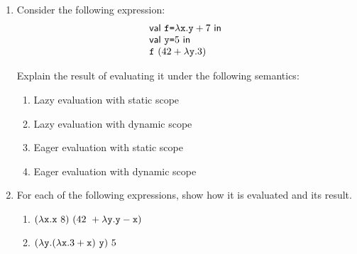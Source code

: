 \begin{enumerate}
\item Consider the following expression:
\[
\begin{array}{l}
  \textsf{val}\ \texttt{f}\texttt{=}\lambda\texttt{x}.\texttt{y}+7\ \textsf{in}\ \\
  \textsf{val}\ \texttt{y}\texttt{=}5\ \textsf{in}\ \\
  \texttt{f}\ (42+\lambda\texttt{y}.3)
 
 
\end{array}
\]

Explain the result of evaluating it under the following semantics:
\begin{enumerate}
  \item Lazy evaluation with static scope
  \item Lazy evaluation with dynamic scope
  \item Eager evaluation with static scope
  \item Eager evaluation with dynamic scope
\end{enumerate}

\item For each of the following \lang expressions, show how it is evaluated and its result.

\begin{enumerate}
  \item
    $(\lambda\texttt{x}.\texttt{x}\ 8)\ (42\ +\lambda\texttt{y}.\texttt{y}-\texttt{x})$
  \item
    $(\lambda\texttt{y}.(\lambda\texttt{x}.3+\texttt{x})\ \texttt{y})\ 5$
\end{enumerate}
\end{enumerate}

